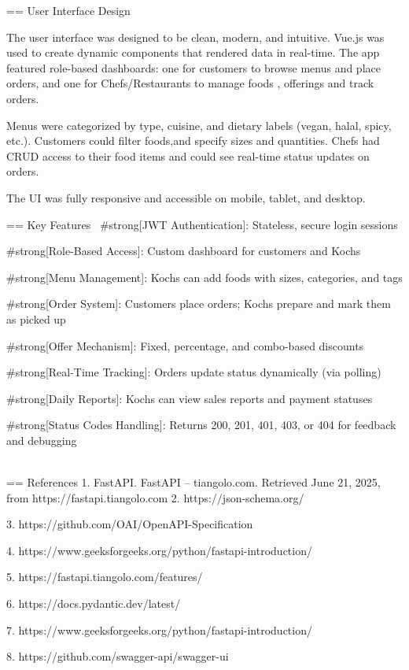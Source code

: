 == User Interface Design

The user interface was designed to be clean, modern, and intuitive. Vue.js was used to create dynamic components that rendered data in real-time. The app featured role-based dashboards: one for customers to browse menus and place orders, and one for Chefs/Restaurants to manage foods , offerings and track orders.

Menus were categorized by type, cuisine, and dietary labels (vegan, halal, spicy, etc.). Customers could filter foods,and specify sizes and quantities. Chefs had CRUD access to their food items and could see real-time status updates on orders.

The UI was fully responsive and accessible on mobile, tablet, and desktop. 

== Key Features
\
#strong[JWT Authentication]: Stateless, secure login sessions

#strong[Role-Based Access]: Custom dashboard for customers and Kochs

#strong[Menu Management]: Kochs can add foods with sizes, categories, and tags

#strong[Order System]: Customers place orders; Kochs prepare and mark them as picked up

#strong[Offer Mechanism]: Fixed, percentage, and combo-based discounts
 
#strong[Real-Time Tracking]: Orders update status dynamically (via polling)

#strong[Daily Reports]: Kochs can view sales reports and payment statuses

#strong[Status Codes Handling]: Returns 200, 201, 401, 403, or 404 for feedback and debugging
\
\
\
\
\
\
\
\
\
\
\
\
\
\
\
\
\
\
\
\
\
\
\
\
\
\
\
\
\
\\
\

== References
1. FastAPI. FastAPI – tiangolo.com. Retrieved June 21, 2025, from https://fastapi.tiangolo.com
2. https://json-schema.org/

3. https://github.com/OAI/OpenAPI-Specification

4. https://www.geeksforgeeks.org/python/fastapi-introduction/

5. https://fastapi.tiangolo.com/features/

6. https://docs.pydantic.dev/latest/

7. https://www.geeksforgeeks.org/python/fastapi-introduction/

8. https://github.com/swagger-api/swagger-ui

